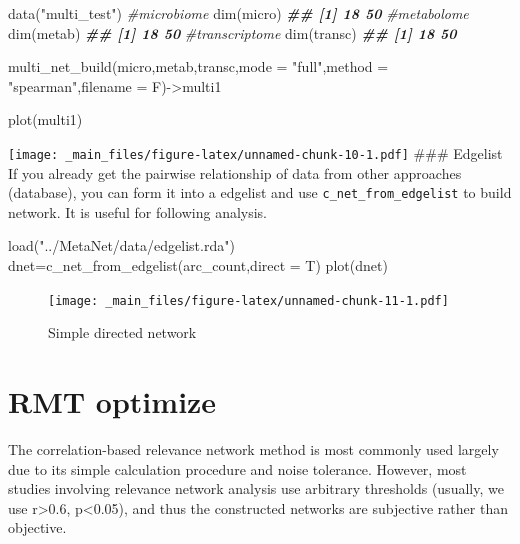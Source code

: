 \documentclass[
]{book}
\newenvironment{Shaded}{\begin{snugshade}}{\end{snugshade}}
\newcommand{\AttributeTok}[1]{\textcolor[rgb]{0.77,0.63,0.00}{#1}}
\newcommand{\CommentTok}[1]{\textcolor[rgb]{0.56,0.35,0.01}{\textit{#1}}}
\newcommand{\DocumentationTok}[1]{\textcolor[rgb]{0.56,0.35,0.01}{\textbf{\textit{#1}}}}
\newcommand{\FunctionTok}[1]{\textcolor[rgb]{0.00,0.00,0.00}{#1}}
\newcommand{\NormalTok}[1]{#1}
\newcommand{\OtherTok}[1]{\textcolor[rgb]{0.56,0.35,0.01}{#1}}
\newcommand{\StringTok}[1]{\textcolor[rgb]{0.31,0.60,0.02}{#1}}
\begin{document}
\begin{Shaded}
\begin{Highlighting}[]
\FunctionTok{data}\NormalTok{(}\StringTok{"multi\_test"}\NormalTok{)}
\CommentTok{\#microbiome}
\FunctionTok{dim}\NormalTok{(micro)}
\DocumentationTok{\#\# [1] 18 50}
\CommentTok{\#metabolome}
\FunctionTok{dim}\NormalTok{(metab)}
\DocumentationTok{\#\# [1] 18 50}
\CommentTok{\#transcriptome}
\FunctionTok{dim}\NormalTok{(transc)}
\DocumentationTok{\#\# [1] 18 50}

\FunctionTok{multi\_net\_build}\NormalTok{(micro,metab,transc,}\AttributeTok{mode =} \StringTok{"full"}\NormalTok{,}\AttributeTok{method =} \StringTok{"spearman"}\NormalTok{,}\AttributeTok{filename =}\NormalTok{ F)}\OtherTok{{-}\textgreater{}}\NormalTok{multi1}

\FunctionTok{plot}\NormalTok{(multi1)}
\end{Highlighting}
\end{Shaded}

\texttt{[image: \_main\_files/figure-latex/unnamed-chunk-10-1.pdf]}
\#\#\# Edgelist
If you already get the pairwise relationship of data from other approaches (database), you can form it into a edgelist and use \texttt{c\_net\_from\_edgelist} to build network. It is useful for following analysis.

\begin{Shaded}
\begin{Highlighting}[]
\FunctionTok{load}\NormalTok{(}\StringTok{"../MetaNet/data/edgelist.rda"}\NormalTok{)}
\NormalTok{dnet}\OtherTok{=}\FunctionTok{c\_net\_from\_edgelist}\NormalTok{(arc\_count,}\AttributeTok{direct =}\NormalTok{ T)}
\FunctionTok{plot}\NormalTok{(dnet)}
\end{Highlighting}
\end{Shaded}

\begin{figure}
\centering
\texttt{[image: \_main\_files/figure-latex/unnamed-chunk-11-1.pdf]}
\caption{\label{fig:unnamed-chunk-11}Simple directed network}
\end{figure}

\hypertarget{rmt-optimize}{%
\section{RMT optimize}\label{rmt-optimize}}

The correlation-based relevance network method is most commonly used largely due to its simple calculation procedure and noise tolerance. However, most studies involving relevance network analysis use arbitrary thresholds (usually, we use r\textgreater0.6, p\textless0.05), and thus the constructed networks are subjective rather than objective.
\end{document}
